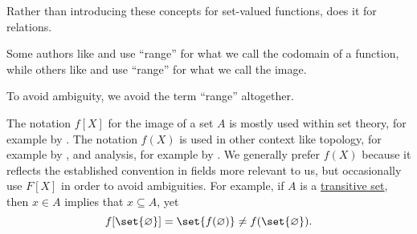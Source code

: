 \begin{comments}
  \item Rather than introducing these concepts for set-valued functions,  does it for relations.

  \item Some authors like  and  use \enquote{range} for what we call the codomain of a function, while others like  and  use \enquote{range} for what we call the image.

  To avoid ambiguity, we avoid the term \enquote{range} altogether.
\end{comments}

\begin{remark}\label{rem:notation_for_function_image}
  The notation \( f[X] \) for the image of a set \( A \) is mostly used within set theory, for example by . The notation \( f(X) \) is used in other context like topology, for example by , and analysis, for example by . We generally prefer \( f(X) \) because it reflects the established convention in fields more relevant to us, but occasionally use \( F[X] \) in order to avoid ambiguities. For example, if \( A \) is a \hyperref[def:transitive_set]{transitive set}, then \( x \in A \) implies that \( x \subseteq A \), yet
  \begin{equation*}
    f[\set{ \varnothing }] = \set{ f(\varnothing) } \neq f(\set{ \varnothing }).
  \end{equation*}
\end{remark}

